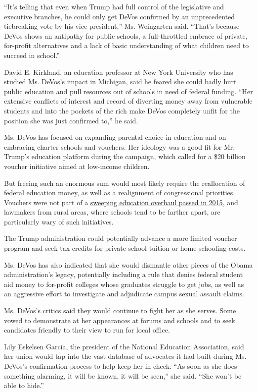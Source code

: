 ``It's telling that even when Trump had full control of the legislative
and executive branches, he could only get DeVos confirmed by an
unprecedented tiebreaking vote by his vice president,'' Ms. Weingarten
said. ``That's because DeVos shows an antipathy for public schools, a
full-throttled embrace of private, for-profit alternatives and a lack of
basic understanding of what children need to succeed in school.''

David E. Kirkland, an education professor at New York University who has
studied Ms. DeVos's impact in Michigan, said he feared she could badly
hurt public education and pull resources out of schools in need of
federal funding. ``Her extensive conflicts of interest and record of
diverting money away from vulnerable students and into the pockets of
the rich make DeVos completely unfit for the position she was just
confirmed to,'' he said.

Ms. DeVos has focused on expanding parental choice in education and on
embracing charter schools and vouchers. Her ideology was a good fit for
Mr. Trump's education platform during the campaign, which called for a
\$20 billion voucher initiative aimed at low-income children.

But freeing such an enormous sum would most likely require the
reallocation of federal education money, as well as a realignment of
congressional priorities. Vouchers were not part of a
\href{https://www.nytimes.com/2015/12/11/us/politics/president-obama-signs-into-law-a-rewrite-of-no-child-left-behind.html}{sweeping
education overhaul passed in 2015}, and lawmakers from rural areas,
where schools tend to be farther apart, are particularly wary of such
initiatives.

The Trump administration could potentially advance a more limited
voucher program and seek tax credits for private school tuition or home
schooling costs.

Ms. DeVos has also indicated that she would dismantle other pieces of
the Obama administration's legacy, potentially including a rule that
denies federal student aid money to for-profit colleges whose graduates
struggle to get jobs, as well as an aggressive effort to investigate and
adjudicate campus sexual assault claims.

Ms. DeVos's critics said they would continue to fight her as she serves.
Some vowed to demonstrate at her appearances at forums and schools and
to seek candidates friendly to their view to run for local office.

Lily Eskelsen García, the president of the National Education
Association, said her union would tap into the vast database of
advocates it had built during Ms. DeVos's confirmation process to help
keep her in check. ``As soon as she does something alarming, it will be
known, it will be seen,'' she said. ``She won't be able to hide.''

